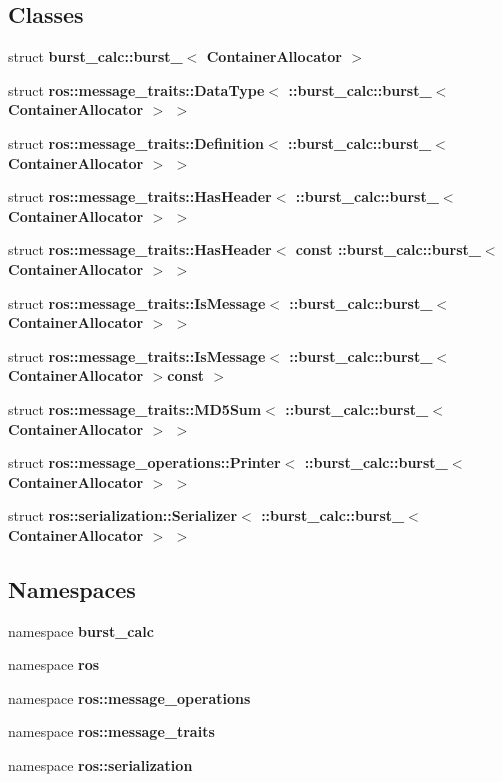 \subsection*{\-Classes}
\begin{DoxyCompactItemize}
\item 
struct {\bf burst\-\_\-calc\-::burst\-\_\-$<$ Container\-Allocator $>$}
\item 
struct {\bf ros\-::message\-\_\-traits\-::\-Data\-Type$<$ \-::burst\-\_\-calc\-::burst\-\_\-$<$ Container\-Allocator $>$ $>$}
\item 
struct {\bf ros\-::message\-\_\-traits\-::\-Definition$<$ \-::burst\-\_\-calc\-::burst\-\_\-$<$ Container\-Allocator $>$ $>$}
\item 
struct {\bf ros\-::message\-\_\-traits\-::\-Has\-Header$<$ \-::burst\-\_\-calc\-::burst\-\_\-$<$ Container\-Allocator $>$ $>$}
\item 
struct {\bf ros\-::message\-\_\-traits\-::\-Has\-Header$<$ const \-::burst\-\_\-calc\-::burst\-\_\-$<$ Container\-Allocator $>$ $>$}
\item 
struct {\bf ros\-::message\-\_\-traits\-::\-Is\-Message$<$ \-::burst\-\_\-calc\-::burst\-\_\-$<$ Container\-Allocator $>$ $>$}
\item 
struct {\bf ros\-::message\-\_\-traits\-::\-Is\-Message$<$ \-::burst\-\_\-calc\-::burst\-\_\-$<$ Container\-Allocator $>$const  $>$}
\item 
struct {\bf ros\-::message\-\_\-traits\-::\-M\-D5\-Sum$<$ \-::burst\-\_\-calc\-::burst\-\_\-$<$ Container\-Allocator $>$ $>$}
\item 
struct {\bf ros\-::message\-\_\-operations\-::\-Printer$<$ \-::burst\-\_\-calc\-::burst\-\_\-$<$ Container\-Allocator $>$ $>$}
\item 
struct {\bf ros\-::serialization\-::\-Serializer$<$ \-::burst\-\_\-calc\-::burst\-\_\-$<$ Container\-Allocator $>$ $>$}
\end{DoxyCompactItemize}
\subsection*{\-Namespaces}
\begin{DoxyCompactItemize}
\item 
namespace {\bf burst\-\_\-calc}
\item 
namespace {\bf ros}
\item 
namespace {\bf ros\-::message\-\_\-operations}
\item 
namespace {\bf ros\-::message\-\_\-traits}
\item 
namespace {\bf ros\-::serialization}
\end{DoxyCompactItemize}
